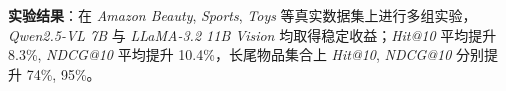 \documentclass{resume}
\begin{document}
\textbf{实验结果}：在 \textit{Amazon Beauty}, \textit{Sports}, \textit{Toys} 等真实数据集上进行多组实验，\textit{Qwen2.5-VL 7B} 与 \textit{LLaMA-3.2 11B Vision} 均取得稳定收益；\textit{Hit@10} 平均提升 8.3\%, \textit{NDCG@10} 平均提升 10.4\%，长尾物品集合上 \textit{Hit@10}, \textit{NDCG@10} 分别提升 74\%, 95\%。









\end{document}
